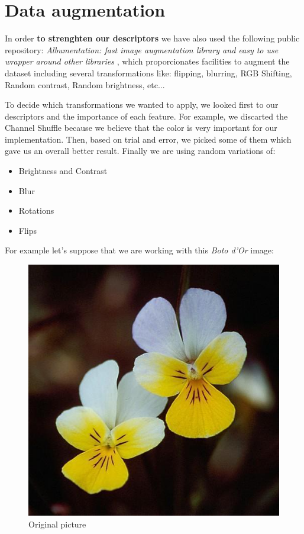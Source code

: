 \documentclass[11]{article}
\begin{document}
\section{Data augmentation}
In order \textbf{to strenghten our descriptors} we have also used the following public repository:  \textit{Albumentation: fast image augmentation library and easy to use wrapper around other libraries} \cite{Albumentations}, which proporcionates facilities to augment the dataset including several transformations like: flipping, blurring, RGB Shifting, Random contrast, Random brightness, etc...
\medskip

To decide which transformations we wanted to apply, we looked first to our descriptors and the importance of each feature. For example, we discarted the Channel Shuffle because we believe that the color is very important for our implementation. Then, based on trial and error, we picked some of them which gave us an overall better result. Finally we are using random variations of:
\begin{itemize}
    \item Brightness and Contrast
    \item Blur
    \item Rotations
    \item Flips
\end{itemize}
For example let's suppose that we are working with this \textit{Boto d'Or} image:
\begin{figure}[H]
    \centering
    \includegraphics[scale=0.25]{images/original.jpg}
    \caption{Original picture}
    \label{original}
\end{figure}
\end{document}
